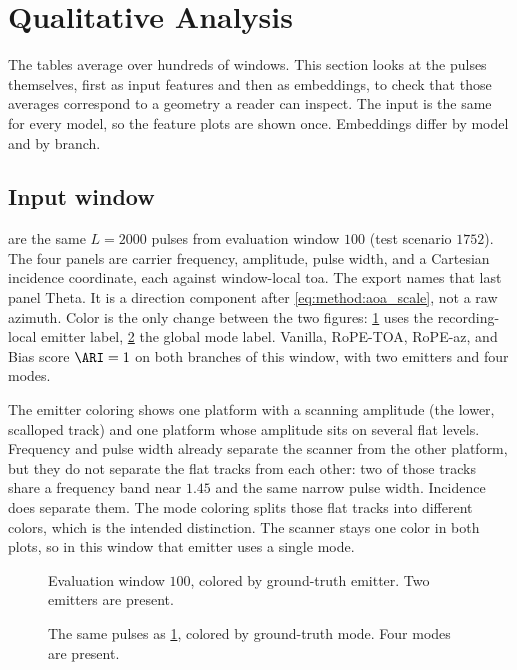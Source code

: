 \section{Qualitative Analysis}\label{sec:exp:qualitative}

The tables average over hundreds of windows.
This section looks at the pulses themselves, first as input features and then as embeddings, to check that those averages correspond to a geometry a reader can inspect.
The input is the same for every model, so the feature plots are shown once.
Embeddings differ by model and by branch.

\subsection*{Input window}\label{sec:exp:qualitative:features}

 are the same $L=2000$ pulses from evaluation window $100$ (test scenario $1752$).
The four panels are carrier frequency, amplitude, pulse width, and a Cartesian incidence coordinate, each against window-local \gls{toa}.
The export names that last panel Theta. It is a direction component after \cref{eq:method:aoa_scale}, not a raw azimuth.
Color is the only change between the two figures: \cref{fig:exp:feat_w100_em} uses the recording-local emitter label, \cref{fig:exp:feat_w100_md} the global mode label.
Vanilla, RoPE-TOA, RoPE-az, and Bias score $\ARI=1$ on both branches of this window, with two emitters and four modes.

The emitter coloring shows one platform with a scanning amplitude (the lower, scalloped track) and one platform whose amplitude sits on several flat levels.
Frequency and pulse width already separate the scanner from the other platform, but they do not separate the flat tracks from each other: two of those tracks share a frequency band near $1.45$ and the same narrow pulse width.
Incidence does separate them.
The mode coloring splits those flat tracks into different colors, which is the intended distinction.
The scanner stays one color in both plots, so in this window that emitter uses a single mode.

\begin{figure}[tbp]
  \centering
  \caption{Evaluation window $100$, colored by ground-truth emitter. Two emitters are present.}
  \label{fig:exp:feat_w100_em}
\end{figure}

\begin{figure}[tbp]
  \centering
  \caption{The same pulses as \cref{fig:exp:feat_w100_em}, colored by ground-truth mode. Four modes are present.}
  \label{fig:exp:feat_w100_md}
\end{figure}

